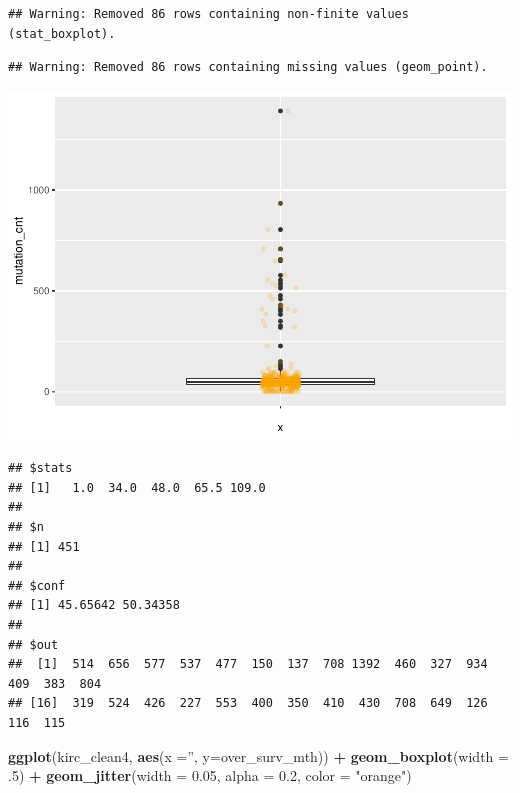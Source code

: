 \documentclass[]{article}
\newenvironment{Shaded}{\begin{snugshade}}{\end{snugshade}}
\newcommand{\KeywordTok}[1]{\textcolor[rgb]{0.13,0.29,0.53}{\textbf{#1}}}
\newcommand{\DataTypeTok}[1]{\textcolor[rgb]{0.13,0.29,0.53}{#1}}
\newcommand{\DecValTok}[1]{\textcolor[rgb]{0.00,0.00,0.81}{#1}}
\newcommand{\FloatTok}[1]{\textcolor[rgb]{0.00,0.00,0.81}{#1}}
\newcommand{\StringTok}[1]{\textcolor[rgb]{0.31,0.60,0.02}{#1}}
\newcommand{\OperatorTok}[1]{\textcolor[rgb]{0.81,0.36,0.00}{\textbf{#1}}}
\newcommand{\NormalTok}[1]{#1}
\begin{document}
\begin{verbatim}
## Warning: Removed 86 rows containing non-finite values (stat_boxplot).
\end{verbatim}

\begin{verbatim}
## Warning: Removed 86 rows containing missing values (geom_point).
\end{verbatim}

\includegraphics{figs/render-unnamed-chunk-20-1.pdf}

\begin{Shaded}
\end{Shaded}

\begin{verbatim}
## $stats
## [1]   1.0  34.0  48.0  65.5 109.0
## 
## $n
## [1] 451
## 
## $conf
## [1] 45.65642 50.34358
## 
## $out
##  [1]  514  656  577  537  477  150  137  708 1392  460  327  934  409  383  804
## [16]  319  524  426  227  553  400  350  410  430  708  649  126  116  115
\end{verbatim}

\begin{Shaded}
\begin{Highlighting}[]
\KeywordTok{ggplot}\NormalTok{(kirc_clean4, }\KeywordTok{aes}\NormalTok{(}\DataTypeTok{x =}\StringTok{''}\NormalTok{, }\DataTypeTok{y=}\NormalTok{over_surv_mth)) }\OperatorTok{+}
\StringTok{     }\KeywordTok{geom_boxplot}\NormalTok{(}\DataTypeTok{width =}\NormalTok{ .}\DecValTok{5}\NormalTok{) }\OperatorTok{+}
\StringTok{     }\KeywordTok{geom_jitter}\NormalTok{(}\DataTypeTok{width =} \FloatTok{0.05}\NormalTok{, }\DataTypeTok{alpha =} \FloatTok{0.2}\NormalTok{, }\DataTypeTok{color =} \StringTok{"orange"}\NormalTok{)}
\end{Highlighting}
\end{Shaded}
\end{document}
